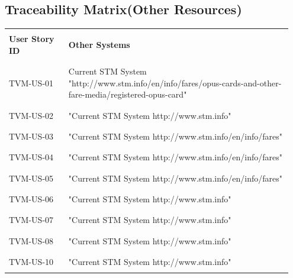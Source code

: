 \documentclass[a4paper,12pt]{report}
\begin{document}
\subsection{Traceability Matrix(Other Resources)}
\begin{longtable}{ | p{0.2\linewidth} | p{0.75\linewidth} |}
	\hline
	
	
	& \\
	\textbf{User Story ID} & \textbf{Other Systems} \\
	& \\
	\hline
	
	& \\
	TVM-US-01 & Current STM System "http://www.stm.info/en/info/fares/opus-cards-and-other-fare-media/registered-opus-card" \\
	& \\
	\hline
	
	& \\
	TVM-US-02 & "Current STM System http://www.stm.info" \\ 
	& \\
	\hline
	
	& \\
	TVM-US-03 & "Current STM System http://www.stm.info/en/info/fares" \\ 
	& \\
	\hline
	
	& \\
	TVM-US-04 & "Current STM System http://www.stm.info/en/info/fares" \\ 
	& \\
	\hline
	
	& \\
	TVM-US-05 & "Current STM System http://www.stm.info/en/info/fares" \\ 
	& \\
	\hline
	
	& \\
	TVM-US-06 & "Current STM System http://www.stm.info" \\ 
	& \\
	\hline
	
	& \\
	TVM-US-07 & "Current STM System http://www.stm.info" \\ 
	& \\
	\hline
	
	& \\
	TVM-US-08 & "Current STM System http://www.stm.info" \\ 
	& \\
	\hline
	
	& \\
	TVM-US-10 & "Current STM System http://www.stm.info" \\ 
	& \\
	\hline
	
\end{longtable}
\end{document}
